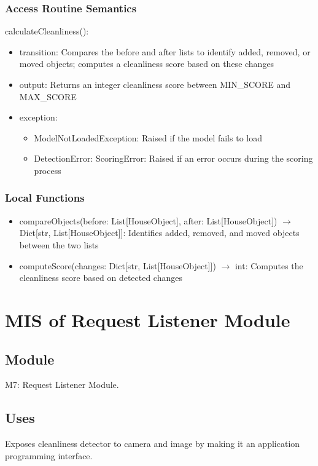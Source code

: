 \documentclass[12pt, titlepage]{article}
\begin{document}
\subsubsection{Access Routine Semantics}

\noindent calculateCleanliness():
\begin{itemize}
\item transition: Compares the before and after lists to identify added, removed, or moved objects; computes a cleanliness score based on these changes
\item output: Returns an integer cleanliness score between MIN{\_}SCORE and MAX{\_}SCORE
\item exception: 
\begin{itemize}
  \item ModelNotLoadedException: Raised if the model fails to load
  \item DetectionError: ScoringError: Raised if an error occurs during the scoring process
\end{itemize}

\end{itemize}


\subsubsection{Local Functions}

\begin{itemize}
  \item compareObjects(before: List[HouseObject], after: List[HouseObject]) $\rightarrow$ Dict[str, List[HouseObject]]: Identifies added, removed, and moved objects between the two lists
  \item computeScore(changes: Dict[str, List[HouseObject]]) $\rightarrow$ int: Computes the cleanliness score based on detected changes
\end{itemize}

\newpage
\section{MIS of Request Listener Module} \label{Module} 

\subsection{Module}

M7: Request Listener Module.

\subsection{Uses}
Exposes cleanliness detector to camera and image by making it an application programming interface.
\end{document}

